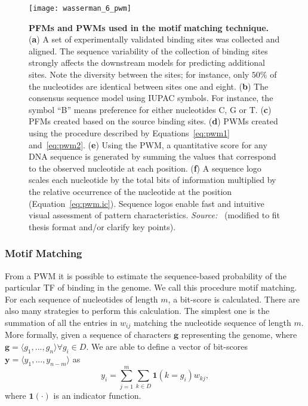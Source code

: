 \begin{figure}[h!]
\centering
\texttt{[image: wasserman\_6\_pwm]}
\caption[PFMs and PWMs used in the motif matching technique]{\textbf{PFMs and PWMs used in the motif matching technique.} (\textbf{a}) A set of experimentally validated binding sites was collected and aligned. The sequence variability of the collection of binding sites strongly affects the downstream models for predicting additional sites. Note the diversity between the sites; for instance, only $50\%$ of the nucleotides are identical between sites one and eight. (\textbf{b}) The consensus sequence model using IUPAC symbols. For instance, the symbol ``B'' means preference for either nucleotides C, G or T. (\textbf{c}) PFMs created based on the source binding sites. (\textbf{d}) PWMs created using the procedure described by Equations~\ref{eq:pwm1} and~\ref{eq:pwm2}. (\textbf{e}) Using the PWM, a quantitative score for any DNA sequence is generated by summing the values that correspond to the observed nucleotide at each position. (\textbf{f}) A sequence logo scales each nucleotide by the total bits of information multiplied by the relative occurrence of the nucleotide at the position (Equation~\ref{eq:pwm.ic}). Sequence logos enable fast and intuitive visual assessment of pattern characteristics. \emph{Source:~\cite{wasserman2004}} (modified to fit thesis format and/or clarify key points).}
\label{fig:wasserman_pwm}
\end{figure}

\subsubsection{Motif Matching}

From a PWM it is possible to estimate the sequence-based probability of the particular TF of binding in the genome. We call this procedure motif matching. For each sequence of nucleotides of length $ m $, a bit-score is calculated. There are also many strategies to perform this calculation. The simplest one is the summation of all the entries in $ w_{ij} $ matching the nucleotide sequence of length $ m $. More formally, given a sequence of characters $\mathbf{g}$ representing the genome, where $\mathbf{g} = \langle{g}_{1}, ..., {g}_{n}\rangle \forall {g}_{i} \in D$. We are able to define a vector of bit-scores $\mathbf{y} = \langle{y}_{1}, ..., {y}_{n-m}\rangle$ as
\begin{equation}
  \label{eq:motif.match}
  {y}_{i} = \sum_{j=1}^{m} \sum_{k \in D} {\mathbf{1}}(k={g}_{i}){w}_{kj},
\end{equation}
where ${\mathbf{1}}(\cdot)$ is an indicator function. 

